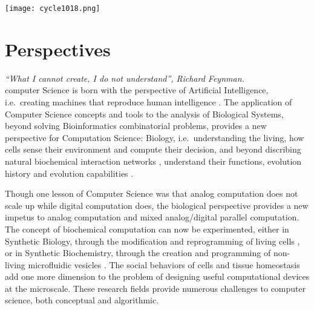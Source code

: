 \documentclass[graybox]{svmult}
\begin{document}
\centerline{\texttt{[image: cycle1018.png]}}

\section{Perspectives}

\hfill\emph{``What I cannot create, I do not understand'', Richard Feynman.}\\

computer Science is born with the perspective of Artificial Intelligence,
i.e.~creating machines that reproduce human intelligence \cite{Turing50mind}.
The application of Computer Science concepts and tools to the analysis of Biological Systems,
beyond solving Bioinformatics combinatorial problems, provides a new perspective for
Computation Science: Biology, i.e.~understanding the living, how cells sense their environment and compute their decision,
and beyond discribing natural biochemical interaction networks \cite{Barabasi16book}, understand their functions, evolution history and evolution capabilities \cite{Valiant13book}.

Though one lesson of Computer Science
was that analog computation does not scale up while digital computation does,
the biological perspective provides a new impetus to analog computation
and mixed analog/digital parallel computation.
The concept of biochemical computation can now be experimented, either in Synthetic Biology,
through the modification and reprogramming of living cells \cite{NBSVPSRDV16science,CERMB15stm}, or in Synthetic Biochemistry, through
the creation and programming of non-living microfluidic vesicles \cite{CAFRM16subm}.
The social behaviors of cells and tissue homeostasis add one more dimension to the problem of designing useful computational devices at the microscale.
These research fields provide numerous challenges to computer science, both conceptual and algorithmic.




\end{document}
